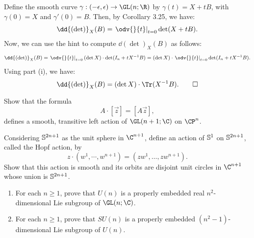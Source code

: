 \begin{solution}[(ii)]
  Define the smooth curve $\gamma : (-\epsilon, \epsilon) \to \GL(n; \R)$ by $\gamma(t) = X + tB$, with $\gamma(0) = X$ and $\gamma'(0) = B$. Then, by Corollary 3.25, we have:
  \[%
    \dd{(\det)}_X(B) = \left.\odv{}{t}\right\rvert_{t=0} \det(X + tB)
  .\]%
  Now, we can use the hint to compute $\dd{(\det)}_X(B)$ as follows:
  \[%
    \dd{(\det)}_X(B) = \left.\odv{}{t}\right\rvert_{t=0} (\det X) \cdot \det(I_n + tX^{-1}B) = (\det X) \cdot \left.\odv{}{t}\right\rvert_{t=0} \det(I_n + tX^{-1}B)
  .\]%
  Using part (i), we have:
  \[%
    \dd{(\det)}_X(B) = (\det X) \cdot \Tr(X^{-1}B)
  .\qedhere\]%
\end{solution}

\begin{problem}[4]
  Show that the formula
  \[%
    A \cdot [\vec{z}] = [A\vec{z}]
  ,\]%
  defines a smooth, transitive left action of $\GL(n + 1; \C)$ on $\CP^n$.
\end{problem}

\begin{solution}
\end{solution}

\begin{problem}[5]
  Considering $\S^{2n+1}$ as the unit sphere in $\C^{n+1}$, define an action of
  $\S^1$ on $\S^{2n+1}$, called the Hopf action, by
  \[%
    z \cdot (w^1, \cdots, w^{n+1}) = (zw^1, \ldots, zw^{n+1})
  .\]%
  Show that this action is smooth and its orbits are disjoint unit circles in $\C^{n+1}$ whose union is $\S^{2n+1}$.
\end{problem}

\begin{solution}
\end{solution}

\begin{problem}[6]
  \begin{enumerate}
    \item For each $n \ge 1$, prove that $U(n)$ is a properly embedded real $n^2$-dimensional Lie subgroup of $\GL(n; \C)$.
    \item For each $n \ge 1$, prove that $SU(n)$ is a properly embedded $(n^2 - 1)$-dimensional Lie subgroup of $U(n)$.
  \end{enumerate}
\end{problem}

\begin{solution}[(i)]
\end{solution}

\begin{solution}[(ii)]
\end{solution}

\begin{problem}
  
\end{problem}

